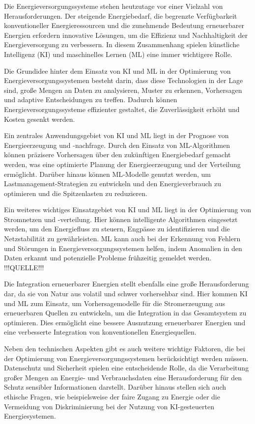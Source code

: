 Die Energieversorgungssysteme stehen heutzutage vor einer Vielzahl von
Herausforderungen. Der steigende Energiebedarf, die begrenzte Verfügbarkeit
konventioneller Energieressourcen und die zunehmende Bedeutung erneuerbarer
Energien erfordern innovative Lösungen, um die Effizienz und Nachhaltigkeit der
Energieversorgung zu verbessern. In diesem Zusammenhang spielen künstliche
Intelligenz (KI) und maschinelles Lernen (ML) eine immer wichtigere Rolle.

Die Grundidee hinter dem Einsatz von KI und ML in der Optimierung von
Energieversorgungssystemen besteht darin, dass diese Technologien in der Lage
sind, große Mengen an Daten zu analysieren, Muster zu erkennen, Vorhersagen und adaptive Entscheidungen zu treffen. Dadurch können
Energieversorgungssysteme effizienter gestaltet, die Zuverlässigkeit erhöht und
Kosten gesenkt werden.

Ein zentrales Anwendungsgebiet von KI und ML liegt in der Prognose von
Energieerzeugung und -nachfrage. Durch den Einsatz von ML-Algorithmen können
präzisere Vorhersagen über den zukünftigen Energiebedarf gemacht werden, was
eine optimierte Planung der Energieerzeugung und der Verteilung ermöglicht.
Darüber hinaus können ML-Modelle genutzt werden, um Lastmanagement-Strategien
zu entwickeln und den Energieverbrauch zu optimieren und die Spitzenlasten zu
reduzieren.

Ein weiteres wichtiges Einsatzgebiet von KI und ML liegt in der Optimierung von
Stromnetzen und -verteilung. Hier können intelligente Algorithmen eingesetzt
werden, um den Energiefluss zu steuern, Engpässe zu identifizieren und die
Netzstabilität zu gewährleisten. ML kann auch bei der Erkennung von Fehlern und
Störungen in Energieversorgungssystemen helfen, indem Anomalien in den Daten
erkannt und potenzielle Probleme frühzeitig gemeldet werden. !!!QUELLE!!!

Die Integration erneuerbarer Energien stellt ebenfalls eine große
Herausforderung dar, da sie von Natur aus volatil und schwer vorhersehbar sind.
Hier kommen KI und ML zum Einsatz, um Vorhersagemodelle für die Stromerzeugung
aus erneuerbaren Quellen zu entwickeln, um die Integration in das Gesamtsystem
zu optimieren. Dies ermöglicht eine bessere Ausnutzung erneuerbarer Energien
und eine verbesserte Integration von konventionellen Energiequellen.

Neben den technischen Aspekten gibt es auch weitere wichtige Faktoren, die bei
der Optimierung von Energieversorgungssystemen berücksichtigt werden müssen.
Datenschutz und Sicherheit spielen eine entscheidende Rolle, da die
Verarbeitung großer Mengen an Energie- und Verbrauchsdaten eine Herausforderung
für den Schutz sensibler Informationen darstellt. Darüber hinaus stellen sich
auch ethische Fragen, wie beispielsweise der faire Zugang zu Energie oder die
Vermeidung von Diskriminierung bei der Nutzung von KI-gesteuerten
Energiesystemen.

